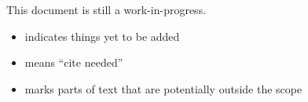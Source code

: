 This document is still a work-in-progress.

\begin{itemize}
    \item {} indicates things yet to be added
    \item \citeneeded means ``cite needed''
    \item {} marks parts of text that are potentially outside the scope
\end{itemize}

\hspace*{1cm}

\noindent
{}
